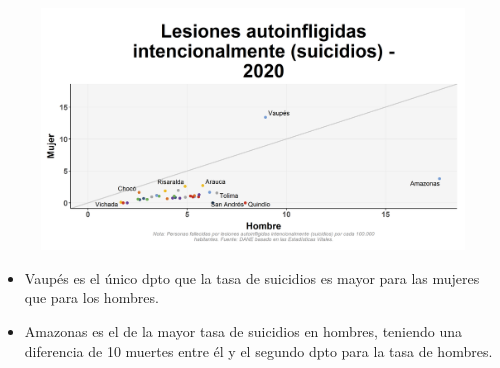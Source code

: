     \begin{figure}[H]
        \caption[Lesiones autoinfligidas intencionalmente (suicidios) por departamentos por género ]{\label{suicid_dpto_gen_scatter} }
        \begin{center}
        \includegraphics[width=\textwidth,keepaspectratio]{img/var_293_scatter.png}
        \end{center}
    \end{figure}
            \begin{itemize}
                \item Vaupés es el único dpto que la tasa de suicidios es mayor para las mujeres que para los hombres.
                \item Amazonas es el de la mayor tasa de suicidios en hombres, teniendo una diferencia de 10 muertes entre él y el segundo dpto para la tasa de hombres.
                \end{itemize}

